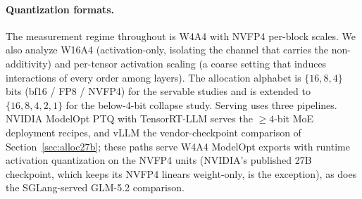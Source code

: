 \paragraph{Quantization formats.} The measurement regime throughout is W4A4 with NVFP4 per-block
scales. We also analyze W16A4 (activation-only, isolating the channel that carries the
non-additivity) and per-tensor activation scaling (a coarse setting that induces interactions of every
order among layers). The allocation alphabet is $\{16, 8, 4\}$ bits (bf16 / FP8 / NVFP4) for the
servable studies and is extended to $\{16,8,4,2,1\}$ for the
below-4-bit collapse study. Serving uses three pipelines. NVIDIA ModelOpt PTQ with TensorRT-LLM
serves the $\ge 4$-bit MoE deployment recipes, and vLLM the vendor-checkpoint comparison of
Section~\ref{sec:alloc27b}; these paths serve W4A4 ModelOpt exports with runtime activation
quantization on the NVFP4 units (NVIDIA's published 27B checkpoint, which keeps its NVFP4 linears
weight-only, is the exception), as does the SGLang-served GLM-5.2 comparison. 
